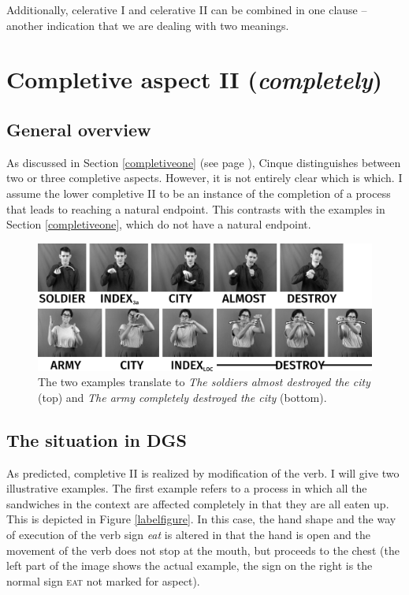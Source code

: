 \noindent Additionally, celerative I and celerative II can be combined in one clause -- another indication that we are dealing with two meanings. 


\section{Completive aspect II (\textit{completely})}\label{completivetwo}
\subsection{General overview}
As discussed in Section \ref{completiveone} (see page \pageref{completiveone}), Cinque distinguishes between two or three completive aspects. However, it is not entirely clear which is which. I assume the lower completive II to be an instance of the completion of a process that leads to reaching a natural endpoint. This contrasts with the examples in Section \ref{completiveone}, which do not have a natural endpoint.


\begin{figure}[bt]
\centering
	\includegraphics[width=1.0\textwidth]{completivetwosw.jpg}
	\caption{The two examples translate to \textit{The soldiers almost destroyed the city} (top) and \textit{The army completely destroyed the city} (bottom).}
	\label{fig:completivetwodgsexampletwo}
\end{figure}


\subsection{The situation in DGS}
As predicted, completive II is realized by modification of the verb. I will give two illustrative examples. The first example refers to a process in which all the sandwiches in the context are affected completely in that they are all eaten up. This is depicted in Figure \ref{labelfigure}. In this case, the hand shape and the way of execution of the verb sign \textit{eat} is altered in that the hand is open and the movement of the verb does not stop at the mouth, but proceeds to the chest (the left part of the image shows the actual example, the sign on the right is the normal sign \textsc{eat} not marked for aspect).

